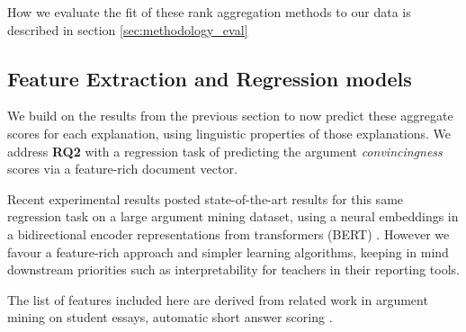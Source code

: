 \documentclass[notitlepage,12pt]{jedm}
\begin{document}
How we evaluate the fit of these rank aggregation methods to our data is 
described in section \ref{sec:methodology_eval}

\subsection{Feature Extraction and Regression models}\label{sec:features}
We build on the results from the previous section to now predict these 
aggregate scores for each explanation, using linguistic properties of those 
explanations.
We address \textbf{RQ2} with a regression task of predicting the argument 
\textit{convincingness} scores via a feature-rich document vector.

Recent experimental results posted state-of-the-art results for this same 
regression task on a large argument mining dataset, using a neural embeddings 
in a bidirectional encoder representations from transformers (BERT) 
\cite{gretz_large-scale_2019}.
However we favour a feature-rich approach and simpler learning algorithms, 
keeping in mind downstream priorities such as interpretability for teachers in 
their reporting tools.

The list of features included here are derived from related work in argument 
mining \cite{habernal_which_2016,persing_end--end_2016} on student 
essays, automatic short answer scoring \cite{mohler_text--text_2009}.
\end{document}
